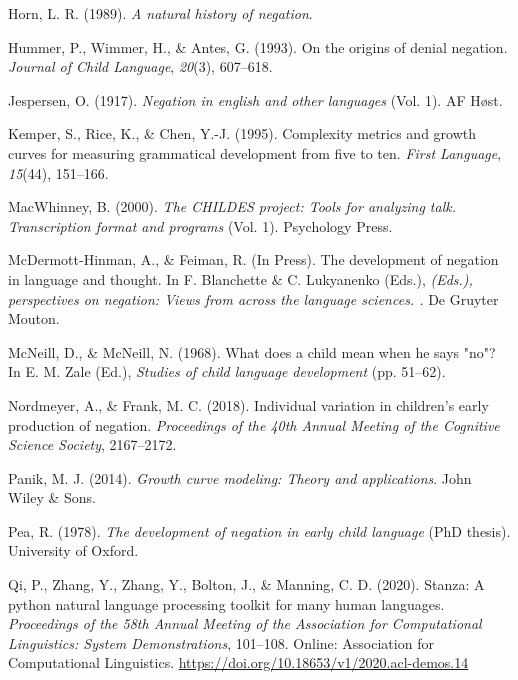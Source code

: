 \documentclass[
  man,floatsintext]{apa6}
\newlength{\cslhangindent}
\newenvironment{CSLReferences}[2] %
 {\begin{list}{}{%
  \setlength{\itemindent}{0pt}
  \setlength{\leftmargin}{0pt}
  \setlength{\parsep}{0pt}
  \ifodd #1
   \setlength{\leftmargin}{\cslhangindent}
   \setlength{\itemindent}{-1\cslhangindent}
  \fi
  \setlength{\itemsep}{#2\baselineskip}}}
 {\end{list}}
\begin{document}
\begin{CSLReferences}{1}{0}
Horn, L. R. (1989). \emph{A natural history of negation}.

Hummer, P., Wimmer, H., \& Antes, G. (1993). On the origins of denial negation. \emph{Journal of Child Language}, \emph{20}(3), 607--618.

Jespersen, O. (1917). \emph{Negation in english and other languages} (Vol. 1). AF H{ø}st.

Kemper, S., Rice, K., \& Chen, Y.-J. (1995). Complexity metrics and growth curves for measuring grammatical development from five to ten. \emph{First Language}, \emph{15}(44), 151--166.

MacWhinney, B. (2000). \emph{The CHILDES project: Tools for analyzing talk. Transcription format and programs} (Vol. 1). Psychology Press.

McDermott-Hinman, A., \& Feiman, R. (In Press). The development of negation in language and thought. In F. Blanchette \& C. Lukyanenko (Eds.), \emph{(Eds.), perspectives on negation: Views from across the language sciences. .} De Gruyter Mouton.

McNeill, D., \& McNeill, N. (1968). What does a child mean when he says "no"? In E. M. Zale (Ed.), \emph{Studies of child language development} (pp. 51--62).

Nordmeyer, A., \& Frank, M. C. (2018). Individual variation in children's early production of negation. \emph{Proceedings of the 40th Annual Meeting of the Cognitive Science Society}, 2167--2172.

Panik, M. J. (2014). \emph{Growth curve modeling: Theory and applications}. John Wiley \& Sons.

Pea, R. (1978). \emph{The development of negation in early child language} (PhD thesis). University of Oxford.

Qi, P., Zhang, Y., Zhang, Y., Bolton, J., \& Manning, C. D. (2020). {S}tanza: A python natural language processing toolkit for many human languages. \emph{Proceedings of the 58th Annual Meeting of the Association for Computational Linguistics: System Demonstrations}, 101--108. Online: Association for Computational Linguistics. \url{https://doi.org/10.18653/v1/2020.acl-demos.14}


\end{CSLReferences}
\end{document}
